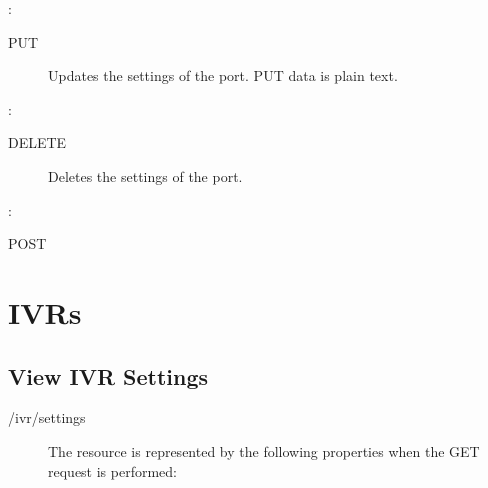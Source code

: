 \documentclass[letterpaper,10pt,english]{sphinxmanual}
\begin{document}
:

\begin{sphinxVerbatim}[commandchars=\\\{\}]
\end{sphinxVerbatim}
\begin{description}
\item[{ PUT}] \leavevmode
Updates the settings of the port. PUT data is plain text.

\end{description}

:

\begin{sphinxVerbatim}[commandchars=\\\{\}]
\end{sphinxVerbatim}
\begin{description}
\item[{ DELETE}] \leavevmode
Deletes the settings of the port.

\end{description}

:

\begin{sphinxVerbatim}[commandchars=\\\{\}]
\end{sphinxVerbatim}

 POST


\section{IVRs}
\label{\detokenize{restapi:ivrs}}

\subsection{View IVR Settings}
\label{\detokenize{restapi:view-ivr-settings}}
 /ivr/settings
\begin{description}
\item[{}] \leavevmode
The resource is represented by the following properties when the GET request is performed:

\end{description}
\end{document}
